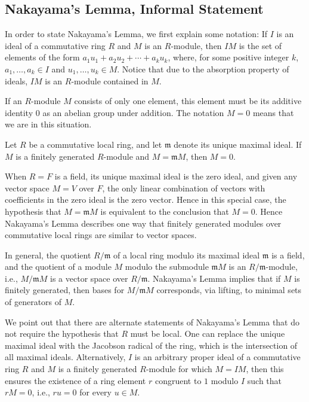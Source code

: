 \documentclass{article}
\begin{document}
\subsection{Nakayama's Lemma, Informal Statement}

In order to state Nakayama's Lemma, we first explain some notation:  If $I$ is
an ideal of a commutative ring $R$ and $M$ is an $R$-module, then $IM$ is the
set of elements of the form $a_1 u_1 + a_2 u_2 + \cdots + a_k u_k$, where, for
some positive integer $k$, $a_1, \ldots, a_k \in I$ and
$u_1, \ldots, u_k \in M$. Notice that due to the absorption property of ideals,
$I M$ is an $R$-module contained in $M$. 	

If an $R$-module $M$ consists of only one element, this element must be its
additive identity $0$ as an abelian group under addition. The notation $M=0$
means that we are in this situation. 

\begin{nak*}
Let $R$ be a commutative local ring, and let $\mathfrak{m}$ denote its unique
maximal ideal. If $M$ is a finitely generated $R$-module and
$M = \mathfrak{m} M$, then $M = 0$. 
\end{nak*}

When $R=F$ is a field, its unique maximal ideal is the zero ideal, and given
any vector space $M=V$ over $F$, the only linear combination of vectors with
coefficients in the zero ideal is the zero vector. Hence in this special case,
the hypothesis that  $M = \mathfrak{m} M$ is equivalent to the conclusion that
$M=0$. Hence Nakayama's Lemma describes one way that finitely generated modules
over commutative local rings are similar to vector spaces. 

In general, the quotient $R/\mathfrak{m}$ of a local ring modulo its maximal
ideal $\mathfrak{m}$ is a field, and the quotient of a module $M$ modulo the
submodule $\mathfrak{m}M$ is an $R/\mathfrak{m}$-module, i.e.,
$M/\mathfrak{m}M$ is a vector space over $R/\mathfrak{m}$. Nakayama's Lemma
implies that if $M$ is finitely generated, then bases for $M/\mathfrak{m}M$
corresponds, via lifting, to minimal sets of generators of $M$. 

We point out that there are alternate statements of Nakayama's Lemma that do
not require the hypothesis that $R$ must be local. One can replace the unique
maximal ideal with the Jacobson radical of the ring, which is the intersection
of all maximal ideals. Alternatively, $I$ is an arbitrary proper ideal of a
commutative ring $R$ and $M$ is a finitely generated $R$-module for which
$M=I M$, then this ensures the existence of a ring element $r$ congruent to
$1$ modulo $I$ such that $r M = 0$, i.e., $r u = 0$ for every $u \in M$. 
\end{document}
